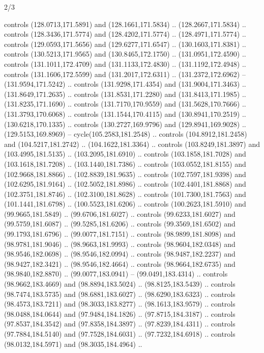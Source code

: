\begin{flagdescription}{2/3}
\begin{scope}[shift={(0.5\flaglength,0.5)},scale=\flagwidth/320]
\begin{scope}[y=0.8pt, x=0.8pt, yscale=-1,shift={(-118.3,-146)}]
  controls (128.0713,171.5891) and (128.1661,171.5834) .. (128.2667,171.5834) ..
  controls (128.3436,171.5774) and (128.4202,171.5774) .. (128.4971,171.5774) ..
  controls (129.0593,171.5656) and (129.6277,171.6547) .. (130.1603,171.8381) ..
  controls (130.5213,171.9565) and (130.8465,172.1750) .. (131.0951,172.4590) ..
  controls (131.1011,172.4709) and (131.1133,172.4830) .. (131.1192,172.4948) ..
  controls (131.1606,172.5599) and (131.2017,172.6311) .. (131.2372,172.6962) --
  (131.9594,171.5242) .. controls (131.9298,171.4354) and (131.9004,171.3463) ..
  (131.8649,171.2635) .. controls (131.8531,171.2280) and (131.8413,171.1985) ..
  (131.8235,171.1690) .. controls (131.7170,170.9559) and (131.5628,170.7666) ..
  (131.3793,170.6068) .. controls (131.1544,170.4115) and (130.8941,170.2519) ..
  (130.6218,170.1335) .. controls (130.2727,169.9796) and (129.8941,169.9028) ..
  (129.5153,169.8969) -- cycle(105.2583,181.2548) .. controls
  (104.8912,181.2458) and (104.5217,181.2742) .. (104.1622,181.3364) .. controls
  (103.8249,181.3897) and (103.4995,181.5135) .. (103.2095,181.6910) .. controls
  (103.1858,181.7028) and (103.1618,181.7208) .. (103.1440,181.7386) .. controls
  (103.0552,181.8155) and (102.9668,181.8866) .. (102.8839,181.9635) .. controls
  (102.7597,181.9398) and (102.6295,181.9164) .. (102.5052,181.8986) .. controls
  (102.4401,181.8868) and (102.3751,181.8746) .. (102.3100,181.8628) .. controls
  (101.7300,181.7563) and (101.1441,181.6798) .. (100.5523,181.6206) .. controls
  (100.2623,181.5910) and (99.9665,181.5849) .. (99.6706,181.6027) .. controls
  (99.6233,181.6027) and (99.5759,181.6087) .. (99.5285,181.6206) .. controls
  (99.3569,181.6502) and (99.1793,181.6796) .. (99.0077,181.7151) .. controls
  (98.9899,181.8098) and (98.9781,181.9046) .. (98.9663,181.9993) .. controls
  (98.9604,182.0348) and (98.9546,182.0698) .. (98.9546,182.0994) .. controls
  (98.9487,182.2237) and (98.9427,182.3421) .. (98.9546,182.4664) .. controls
  (98.9664,182.6735) and (98.9840,182.8870) .. (99.0077,183.0941) --
  (99.0491,183.4314) .. controls (98.9662,183.4669) and (98.8894,183.5024) ..
  (98.8125,183.5439) .. controls (98.7474,183.5735) and (98.6881,183.6027) ..
  (98.6290,183.6323) .. controls (98.4573,183.7211) and (98.3033,183.8277) ..
  (98.1613,183.9579) .. controls (98.0488,184.0644) and (97.9484,184.1826) ..
  (97.8715,184.3187) .. controls (97.8537,184.3542) and (97.8358,184.3897) ..
  (97.8239,184.4311) .. controls (97.7884,184.5140) and (97.7528,184.6031) ..
  (97.7232,184.6918) .. controls (98.0132,184.5971) and (98.3035,184.4964) ..

\end{scope}
\end{scope}
\end{flagdescription}
